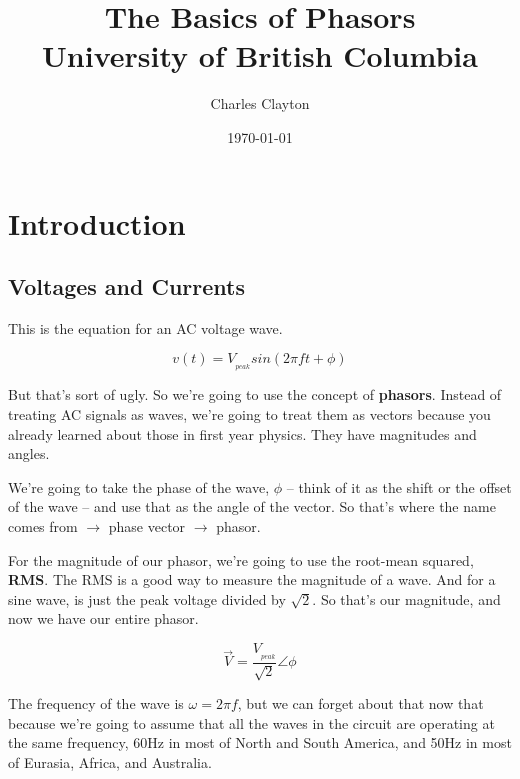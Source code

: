 \documentclass[12pt]{extarticle}
\begin{document}

\title{\huge The Basics of Phasors \\ \Large \medskip University of British Columbia}
\date{\today}
\author{Charles Clayton}
\maketitle

\thispagestyle{empty}

\setcounter{page}{0}

\clearpage


\doublespacing

\section{Introduction}

\subsection{Voltages and Currents}

This is the equation for an AC voltage wave.

$$ v(t) = V_{_{peak}} sin( 2\pi f t + \phi)$$

But that's sort of ugly. So we're going to use the concept of \textbf{phasors}. Instead of treating AC signals as waves, we're going to treat them as vectors because you already learned about those in first year physics. They have magnitudes and angles. 

We're going to take the phase of the wave, $\phi$ -- think of it as the shift or the offset of the wave -- and use that as the angle of the vector. So that's where the name comes from $\rightarrow$ phase vector $\rightarrow$ phasor.

For the magnitude of our phasor, we're going to use the root-mean squared, \textbf{RMS}. The RMS is a good way to measure the magnitude of a wave. And for a sine wave, is just the peak voltage divided by $\sqrt{2}$. So that's our magnitude, and now we have our entire phasor.

$$ \vec{V} = \frac{V_{_{peak}}}{\sqrt{2}} \angle \phi $$

The frequency of the wave is $\omega = 2\pi f$, but we can forget about that now that because we're going to assume that all the waves in the circuit are operating at the same frequency, 60Hz in most of North and South America, and 50Hz in most of Eurasia, Africa, and Australia. %
\end{document}
